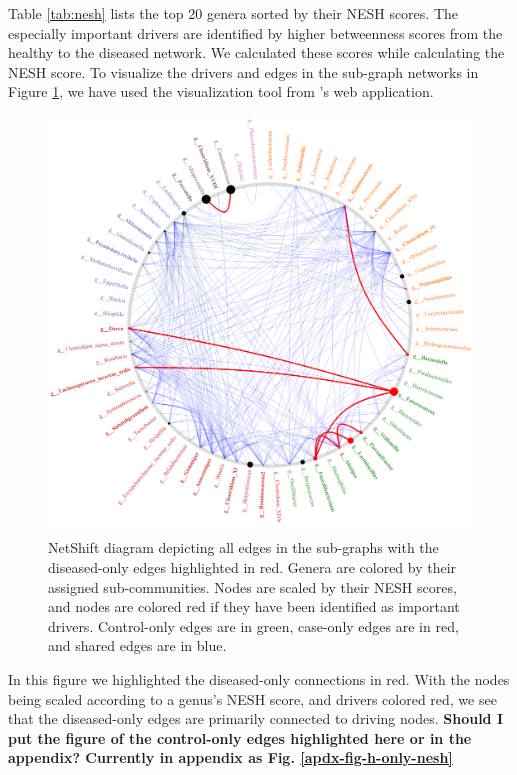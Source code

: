 Table \ref{tab:nesh} lists the top 20 genera sorted by their \acrshort{NESH} scores. The especially important drivers are identified by higher betweenness scores from the healthy to the diseased network. We calculated these scores while calculating the \acrshort{NESH} score. To visualize the drivers and edges in the sub-graph networks in Figure \ref{fig:res-case-only}, we have used the visualization tool from \citeauthor{Kuntal2018}'s web application.
\begin{figure}[htb!]
    \centering
    \includegraphics[width=1.0\linewidth]{figure/results/case_only.png}
    \caption[NetShift diagram depicting all edges in the sub-graphs with the diseased-only edges highlighted in red.]{NetShift diagram depicting all edges in the sub-graphs with the diseased-only edges highlighted in red. Genera are colored by their assigned sub-communities. Nodes are scaled by their \acrshort{NESH} scores, and nodes are colored red if they have been identified as important drivers. Control-only edges are in green, case-only edges are in red, and shared edges are in blue.}
    \label{fig:res-case-only}
\end{figure}
In this figure we highlighted the diseased-only connections in red. With the nodes being scaled according to a genus's \acrshort{NESH} score, and drivers colored red, we see that the diseased-only edges are primarily connected to driving nodes. \textbf{Should I put the figure of the control-only edges highlighted here or in the appendix? Currently in appendix as Fig. \ref{apdx-fig-h-only-nesh}}

